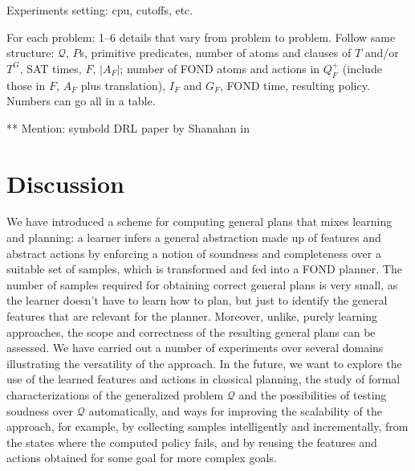 \documentclass[letterpaper]{article} %
\newcommand{\Omit}[1]{}
\newcommand{\Q}{\mathcal{Q}}
\begin{document}
Experiments setting: cpu, cutoffs, etc.

For each problem: 1--6 details that vary from problem to problem. Follow same structure:
$\Q$, $P$s, primitive predicates, number of atoms and clauses  of $T$ and/or $T^G$,
SAT times,  $F$, $|A_F|$;  number of FOND atoms and actions in $Q^+_F$ (include those in $F$, $A_F$ plus translation), $I_F$ and $G_F$,
FOND time, resulting policy.  Numbers can go all in a table.

** Mention: symbold DRL paper by Shanahan in 

\section{Discussion}

We have introduced a scheme for computing general plans that mixes learning and planning: a learner infers
a general abstraction made up of features and abstract actions by enforcing  a notion of soundness and completeness
over a suitable set of samples, which is transformed and fed into a FOND planner.
The number of samples required for obtaining correct general plans is very small,
as the learner doesn't have to learn how to plan,  but just to identify the
general features that are relevant for the planner. Moreover, unlike, purely
learning approaches, the scope and correctness of the resulting general plans
can be assessed.  We have carried out a number of experiments over several
domains illustrating the versatility of the approach. In the future, we
want to explore the use of the learned  features and actions
in classical planning, the study of  formal characterizations
of the generalized problem $\Q$ and  the possibilities
of testing soudness over $\Q$ automatically, and ways
for improving the scalability of the approach, for example,
by collecting samples intelligently and incrementally,
from the states where the computed  policy fails,
and by reusing the features and actions obtained
for some goal for more complex goals.

\Omit{


** discussion  of experiments; things we do well and not, scope, lessons. limitations (expressive? scalability?)

** briefly related work, expanding paragraph in intro.

** summary and cconlusions
}



\end{document}
